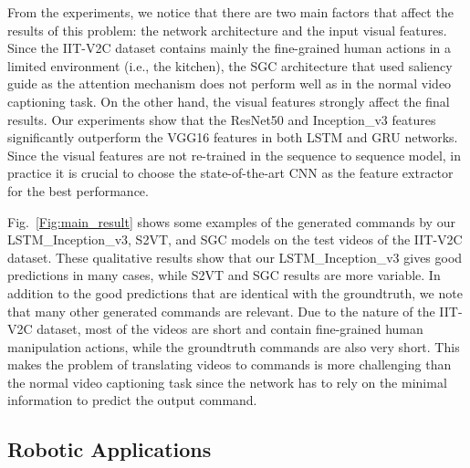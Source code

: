 From the experiments, we notice that there are two main factors that affect the results of this problem: the network architecture and the input visual features. Since the IIT-V2C dataset contains mainly the fine-grained human actions in a limited environment (i.e., the kitchen), the SGC architecture that used saliency guide as the attention mechanism does not perform well as in the normal video captioning task. On the other hand, the visual features strongly affect the final results. Our experiments show that the ResNet50 and Inception\_v3 features significantly outperform the VGG16 features in both LSTM and GRU networks. Since the visual features are not re-trained in the sequence to sequence model, in practice it is crucial to choose the state-of-the-art CNN as the feature extractor for the best performance.


Fig.~\ref{Fig:main_result} shows some examples of the generated commands by our LSTM\_Inception\_v3, S2VT, and SGC models on the test videos of the IIT-V2C dataset. These qualitative results show that our LSTM\_Inception\_v3 gives good predictions in many cases, while S2VT and SGC results are more variable. In addition to the good predictions that are identical with the groundtruth, we note that many other generated commands are relevant. Due to the nature of the IIT-V2C dataset, most of the videos are short and contain fine-grained human manipulation actions, while the groundtruth commands are also very short. This makes the problem of translating videos to commands is more challenging than the normal video captioning task since the network has to rely on the minimal information to predict the output command.  


\subsection{Robotic Applications}

